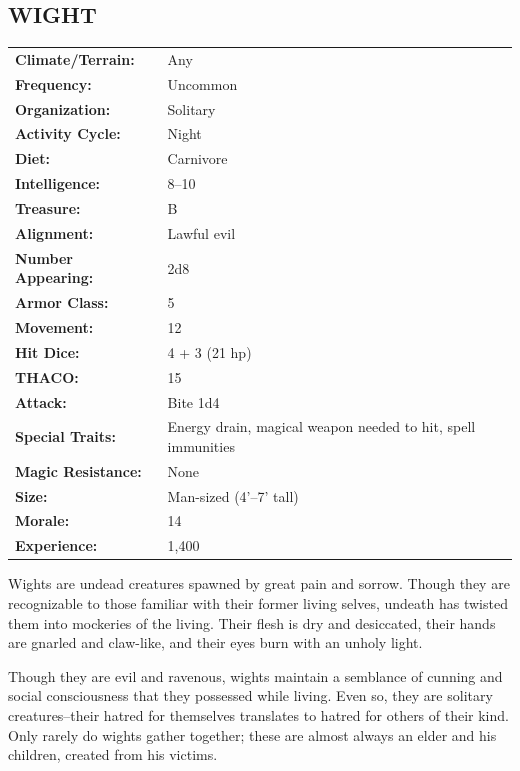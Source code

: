\begin{multicols}{2}
\noindent
\begin{minipage}{\columnwidth}

\vspace{1em}

\subsection{WIGHT}

\noindent \begin{tabular}{p{}p{}}
\textbf{Climate/Terrain:}	& Any	\\
\textbf{Frequency:} 		& Uncommon	\\
\textbf{Organization:} 		& Solitary	\\
\textbf{Activity Cycle:} 	& Night	\\
\textbf{Diet:} 				& Carnivore	\\
\textbf{Intelligence:} 		& 8--10	\\
\textbf{Treasure:} 			& B	\\
\textbf{Alignment:} 		& Lawful evil	\\
\hline
\textbf{Number Appearing:} 	& 2d8	\\
\textbf{Armor Class:} 		& 5	\\
\textbf{Movement:} 			& 12	\\
\textbf{Hit Dice:} 			& 4 + 3 (21 hp)	\\
\textbf{THACO:} 			& 15	\\
\textbf{Attack:} 			& Bite 1d4	\\
\textbf{Special Traits:} & Energy drain, magical weapon needed to hit, spell immunities	\\
\textbf{Magic Resistance:} 	& None	\\
\textbf{Size:} 				& Man-sized (4'--7' tall)	\\
\textbf{Morale:} 			& 14	\\
\textbf{Experience:} 		& 1,400	\\ %
\end{tabular}

\end{minipage}

Wights are undead creatures spawned by great pain and sorrow. Though they are recognizable to those familiar with their former living selves, undeath has twisted them into mockeries of the living. Their flesh is dry and desiccated, their hands are gnarled and claw-like, and their eyes burn with an unholy light.

Though they are evil and ravenous, wights maintain a semblance of cunning and social consciousness that they possessed while living. Even so, they are solitary creatures--their hatred for themselves translates to hatred for others of their kind. Only rarely do wights gather together; these are almost always an elder and his children, created from his victims.


\end{multicols}
